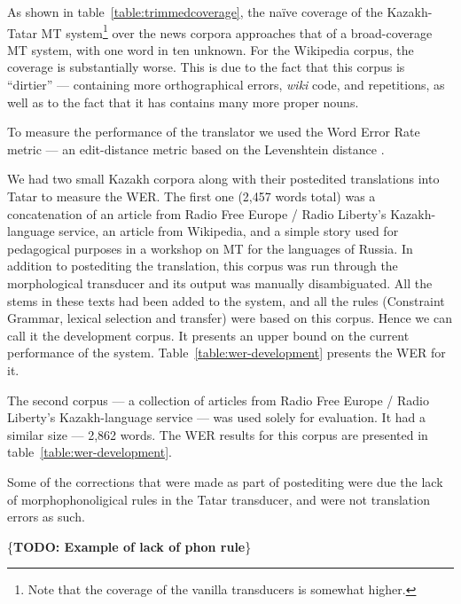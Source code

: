\documentclass[11pt]{article}
\newcommand{\todo}[1]{\{\textbf{TODO: #1}\}}
\begin{document}
As shown in table~\ref{table:trimmedcoverage}, the naïve coverage of the Kazakh-Tatar MT 
system\footnote{Note that the coverage of the vanilla transducers is somewhat higher.} over 
the news corpora approaches that of a broad-coverage MT system, with one word in ten unknown.
For the Wikipedia corpus, the coverage 
is substantially worse.  This is due to the fact that this corpus is ``dirtier'' --- 
containing more orthographical errors, \emph{wiki} code, and repetitions, as well as to the 
fact that it has contains many more proper nouns.

To measure the performance of the translator we used the Word Error Rate metric --- an edit-distance metric based on the
Levenshtein distance \citep{levenshtein/1966}.

We had two small Kazakh corpora along with their postedited translations into Tatar to measure the WER.
The first one (2,457 words total) was a concatenation of an article from Radio Free Europe / Radio Liberty's
Kazakh-language service, an article from Wikipedia, and a simple story used for pedagogical purposes in a workshop
on MT for the languages of Russia. In addition to postediting the translation, this corpus was run through the
morphological transducer and its output was manually disambiguated. All the stems in these texts had been added to
the system, and all the rules (Constraint Grammar, lexical selection and transfer) were based on this corpus.
Hence we can call it the development corpus. It presents an upper bound on the current performance
of the system. Table~\ref{table:wer-development} presents the WER for it. %

The second corpus --- a collection of articles from Radio Free Europe / Radio Liberty's Kazakh-language service --- was used solely for evaluation.  It had a similar size --- 2,862 words.
The WER results for this corpus are presented in table~\ref{table:wer-development}. %

Some of the corrections that were made as part of postediting were due the lack of morphophonoligical rules in the Tatar transducer, and were not translation errors as such.

\todo{Example of lack of phon rule}

\end{document}
